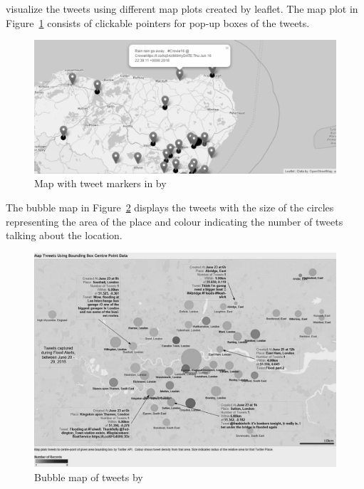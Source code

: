  visualize the tweets using different map plots
 created by leaflet. The map plot in Figure~\ref{fig:baker_marker} consists of clickable pointers for pop-up boxes of the tweets.

\begin{figure}[H]
\begin{center}
  \includegraphics[width=\columnwidth]{images/baker_marker.png}
\end{center}
\caption{Map with tweet markers in by }
\label{fig:baker_marker}
\end{figure}

The bubble map in Figure~\ref{fig:baker_bubble} displays the tweets with the size of the circles
representing the area of the place and colour indicating the number of tweets talking about the
location.
\begin{figure}[H]
\begin{center}
  \includegraphics[width=\columnwidth]{./images/baker_bubble.png}
\end{center}
\caption{Bubble map of tweets by }
\label{fig:baker_bubble}
\end{figure}
